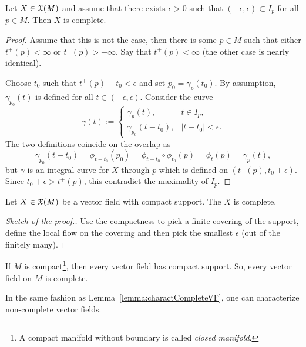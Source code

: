\begin{lemma}\label{lemma:charactCompleteVF}
	Let $X\in\mathfrak{X}(M)$ and assume that there exists $\epsilon >0$ such that $(-\epsilon, \epsilon)\subset I_p$ for all $p \in M$.
	Then $X$ is complete.
\end{lemma}
\begin{proof}
	Assume that this is not the case, then there is some $p\in M$ such that either $t^+(p) < \infty$ or $t_-(p)>-\infty$.
	Say that $t^+(p) < \infty$ (the other case is nearly identical).

	Choose $t_0$ such that $t^+(p) - t_0 < \epsilon$ and set $p_0 = \gamma_p(t_0)$. By assumption, $\gamma_{p_0}(t)$ is defined for all $t\in(-\epsilon, \epsilon)$. Consider the curve
	\begin{equation}
		\gamma(t) := \begin{cases}
			\gamma_p(t),         & t\in I_p,         \\
			\gamma_{p_0}(t-t_0), & |t-t_0|<\epsilon.
		\end{cases}
	\end{equation}
	The two definitions coincide on the overlap as
	\begin{equation}
		\gamma_{p_0}(t-t_0) = \phi_{t-t_0}(p_0) = \phi_{t-t_0}\circ\phi_{t_0}(p) = \phi_t(p) = \gamma_p(t),
	\end{equation}
	but $\gamma$ is an integral curve for $X$ through $p$ which is defined on $(t^-(p), t_0+\epsilon)$.
	Since $t_0 + \epsilon > t^+(p)$, this contradict the maximality of $I_p$.
\end{proof}

\begin{corollary}
	Let $X\in\mathfrak{X}(M)$ be a vector field with compact support. The $X$ is complete.
\end{corollary}
\begin{proof}[Sketch of the proof.]
	Use the compactness to pick a finite covering of the support, define the local flow on the covering and then pick the smallest $\epsilon$ (out of the finitely many).
\end{proof}

\begin{corollary}
	If $M$ is compact\footnote{A compact manifold without boundary is called \emph{closed manifold}.}, then every vector field has compact support.
	So, every vector field on $M$ is complete.
\end{corollary}

In the same fashion as Lemma~\ref{lemma:charactCompleteVF}, one can characterize non-complete vector fields.

